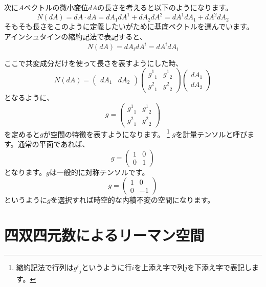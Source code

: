 \documentclass[a4paper,12pt,notitlepage]{jsreport}
\begin{document}
次に$A$ベクトルの微小変位$dA$の長さを考えると以下のようになります。
\begin{equation}
  N(dA)=dA\cdot dA=dA_1dA^1+dA_2dA^2=dA^1dA_1+dA^2dA_2
\end{equation}
そもそも長さをこのように定義したいがために基底ベクトルを選んでいます。
アインシュタインの縮約記法で表記すると、
\begin{equation}
  N(dA)=dA_idA^i=dA^idA_i
\end{equation}

ここで共変成分だけを使って長さを表すようにした時、
\begin{equation}
  N(dA)=
  \begin{pmatrix}
    dA_1&dA_2
  \end{pmatrix}
  \begin{pmatrix}
    {g^1}_1&{g^1}_2\\{g^2}_1&{g^2}_2
  \end{pmatrix}
  \begin{pmatrix}
    dA_1\\dA_2
  \end{pmatrix}
\end{equation}
となるように、
\begin{equation}
  g=
  \begin{pmatrix}
    {g^1}_1&{g^1}_2\\{g^2}_1&{g^2}_2
  \end{pmatrix}
\end{equation}
を定めると$g$が空間の特徴を表すようになります。
\footnote{縮約記法で行列は${g^i}_j$というように行$i$を上添え字で列$j$を下添え字で表記します。}
$g$を計量テンソルと呼びます。通常の平面であれば、
\begin{equation}
  g=
  \begin{pmatrix}
    1&0\\0&1
  \end{pmatrix}
\end{equation}
となります。$g$は一般的に対称テンソルです。
\begin{equation}
  g=
  \begin{pmatrix}
    1&0\\0&-1
  \end{pmatrix}
\end{equation}
というように$g$を選択すれば時空的な内積不変の空間になります。

\section{四双四元数によるリーマン空間}
\end{document}
